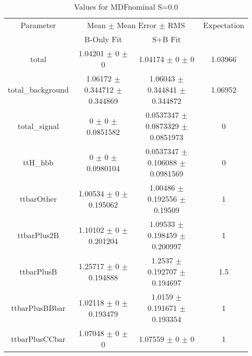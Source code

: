 \begin{table}
\centering
\caption{Values for MDFnominal S=0.0}
\begin{tabular}{cccc}
\toprule
Parameter & \multicolumn{2}{c}{Mean $\pm$ Mean Error $\pm$ RMS} & Expectation\\
 & B-Only Fit & S+B Fit & \\
\midrule
total & \num{1.04201} $\pm$ \num{0} $\pm$ \num{0} & \num{1.04174} $\pm$ \num{0} $\pm$ \num{0} & \num{1.03966}\\
total\_background & \num{1.06172} $\pm$ \num{0.344712} $\pm$ \num{0.344869} & \num{1.06043} $\pm$ \num{0.344841} $\pm$ \num{0.344872} & \num{1.06952}\\
total\_signal & \num{0} $\pm$ \num{0} $\pm$ \num{0.0851582} & \num{0.0537347} $\pm$ \num{0.0873329} $\pm$ \num{0.0851973} & \num{0}\\
ttH\_hbb & \num{0} $\pm$ \num{0} $\pm$ \num{0.0980104} & \num{0.0537347} $\pm$ \num{0.106088} $\pm$ \num{0.0981569} & \num{0}\\
ttbarOther & \num{1.00534} $\pm$ \num{0} $\pm$ \num{0.195062} & \num{1.00486} $\pm$ \num{0.192556} $\pm$ \num{0.19509} & \num{1}\\
ttbarPlus2B & \num{1.10102} $\pm$ \num{0} $\pm$ \num{0.201204} & \num{1.09533} $\pm$ \num{0.198459} $\pm$ \num{0.200997} & \num{1}\\
ttbarPlusB & \num{1.25717} $\pm$ \num{0} $\pm$ \num{0.194888} & \num{1.2537} $\pm$ \num{0.192707} $\pm$ \num{0.194697} & \num{1.5}\\
ttbarPlusBBbar & \num{1.02118} $\pm$ \num{0} $\pm$ \num{0.193479} & \num{1.0159} $\pm$ \num{0.191671} $\pm$ \num{0.193354} & \num{1}\\
ttbarPlusCCbar & \num{1.07048} $\pm$ \num{0} $\pm$ \num{0} & \num{1.07559} $\pm$ \num{0} $\pm$ \num{0} & \num{1}\\
\bottomrule
\end{tabular}
\end{table}